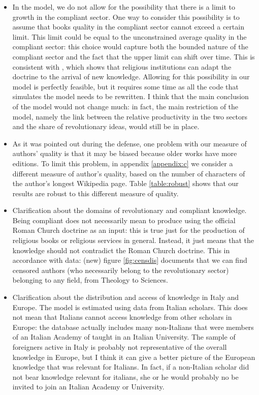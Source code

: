 \begin{itemize}
\item In the model, we do not allow for the possibility that there is a limit to growth in the compliant sector. One way to consider this possibility is to assume that books quality in the compliant sector cannot exceed a certain limit. This limit could be equal to the unconstrained average quality in the compliant sector: this choice would capture both the bounded nature of the compliant sector and the fact that the upper limit can shift over time. This is consistent with , which shows that religious institutions can adapt the doctrine to the arrival of new knowledge. Allowing for this possibility in our model is perfectly feasible, but it requires some time as all the code that simulates the model needs to be rewritten. I think that the main conclusion of the model would not change much: in fact, the main restriction of the model, namely the link between the relative productivity in the two sectors and the share of revolutionary ideas, would still be in place.

\item As it was pointed out during the defense, one problem with our measure of authors' quality is that it may be biased because older works have more editions. To limit this problem, in appendix \ref{appendix:c} we consider a different measure of author's quality, based on the number of characters of the author's longest Wikipedia page. Table \ref{table:robust} shows that our results are robust to this different measure of quality.

\item Clarification about the domains of revolutionary and compliant knowledge. Being compliant does not necessarily mean to produce using the official Roman Church doctrine as an input: this is true just for the production of religious books or religious services in general. Instead, it just means that the knowledge should not contradict the Roman Church doctrine. This in accordance with data: (new) figure \ref{fig:censdis} documents that we can find censored authors (who necessarily belong to the revolutionary sector) belonging to any field, from Theology to Sciences.

\item Clarification about the distribution and access of knowledge in Italy and Europe. The model is estimated using data from Italian scholars. This does not mean that Italians cannot access knowledge from other scholars in Europe: the database actually includes many non-Italians that were members of an Italian Academy of taught in an Italian University. The sample of foreigners active in Italy is probably not representative of the overall knowledge in Europe, but I think it can give a better picture of the European knowledge that was relevant for Italians. In fact, if a non-Italian scholar did not bear knowledge relevant for italians, she or he would probably no be invited to join an Italian Academy or University.



\end{itemize}
